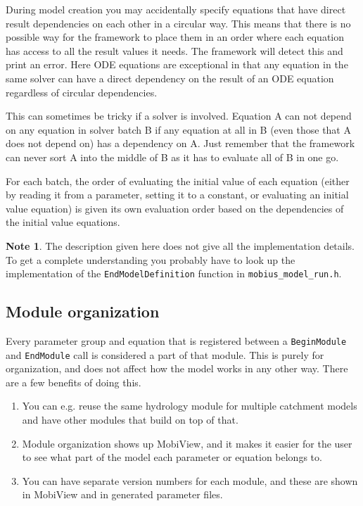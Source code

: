\documentclass[11pt]{article}
\theoremstyle{definition}
\newtheorem{mynote}{Note}
\newenvironment{note}%
  {\begin{lrbox}{\notebox}%
   \begin{minipage}{\dimexpr\linewidth-2\fboxsep}
   \begin{mynote}}%
  {\end{mynote}%
   \end{minipage}%
   \end{lrbox}%
   \begin{trivlist}
     \item[]\colorbox{silver}{\usebox\notebox}
   \end{trivlist}}
\begin{document}
During model creation you may accidentally specify equations that have direct result dependencies on each other in a circular way. This means that there is no possible way for the framework to place them in an order where each equation has access to all the result values it needs. The framework will detect this and print an error. Here ODE equations are exceptional in that any equation in the same solver can have a direct dependency on the result of an ODE equation regardless of circular dependencies.

This can sometimes be tricky if a solver is involved. Equation A can not depend on any equation in solver batch B if any equation at all in B (even those that A does not depend on) has a dependency on A. Just remember that the framework can never sort A into the middle of B as it has to evaluate all of B in one go.

For each batch, the order of evaluating the initial value of each equation (either by reading it from a parameter, setting it to a constant, or evaluating an initial value equation) is given its own evaluation order based on the dependencies of the initial value equations.

\begin{note}
The description given here does not give all the implementation details. To get a complete understanding you probably have to look up the implementation of the {\tt EndModelDefinition} function in {\tt mobius\_model\_run.h}.
\end{note}

\subsection{Module organization}

Every parameter group and equation that is registered between a {\tt BeginModule} and {\tt EndModule} call is considered a part of that module. This is purely for organization, and does not affect how the model works in any other way. There are a few benefits of doing this.

\begin{enumerate}[i]
\item You can e.g. reuse the same hydrology module for multiple catchment models and have other modules that build on top of that.
\item Module organization shows up MobiView, and it makes it easier for the user to see what part of the model each parameter or equation belongs to.
\item You can have separate version numbers for each module, and these are shown in MobiView and in generated parameter files.
\end{enumerate}
\end{document}
